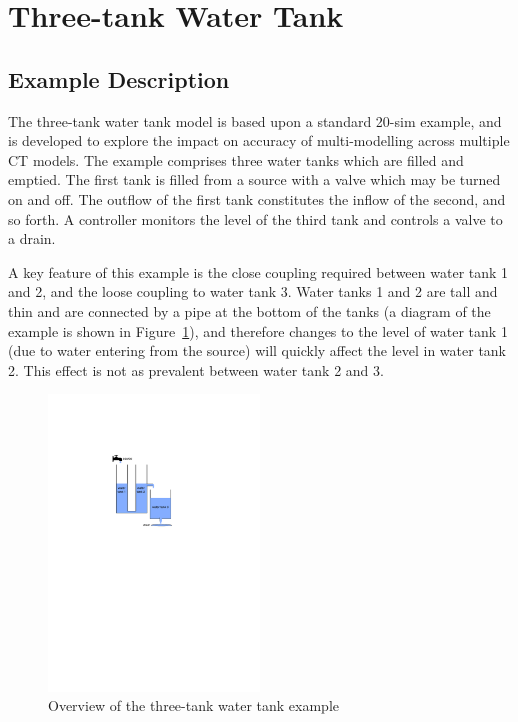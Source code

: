 \section{Three-tank Water Tank}
\label{sec:threetank}


\subsection{Example Description}
\label{sec:threetank_desc}

The three-tank water tank model is based upon a standard 20-sim example, and is developed to explore the impact on accuracy of multi-modelling across multiple CT models. The example comprises three water tanks which are filled and emptied. The first tank is filled from a source with a valve which may be turned on and off. The outflow of the first tank constitutes the inflow of the second, and so forth. A controller monitors the level of the third tank and controls a valve to a drain. 

A key feature of this example is the close coupling required between water tank 1 and 2, and the loose coupling to water tank 3. Water tanks 1 and 2 are tall and thin and are connected by a pipe at the bottom of the tanks (a diagram of the example is shown in Figure~\ref{fig:threetankoverview}), and therefore changes to the level of water tank 1 (due to water entering from the source) will quickly affect the level in water tank 2. This effect is not as prevalent between water tank 2 and 3. 


\begin{figure}[htbp]
\begin{center}
\includegraphics[width=0.5\textwidth]{threetank/ttwt_overview}
\caption{Overview of the three-tank water tank example}
\label{fig:threetankoverview}
\end{center}
\end{figure}

